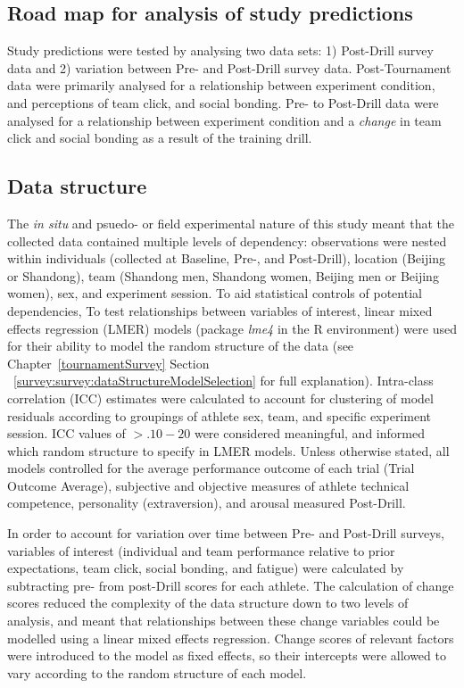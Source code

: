 \subsection{Road map for analysis of study predictions}
Study predictions were tested by analysing two data sets: 1) Post-Drill survey data and 2) variation between Pre- and Post-Drill survey data.  Post-Tournament data were primarily analysed for a relationship between experiment condition, and perceptions of team click, and social bonding.  Pre- to Post-Drill data were analysed for a relationship between experiment condition and a \textit{change} in team click and social bonding as a result of the training drill.


\subsection{Data structure}
The \textit{in situ} and psuedo- or field experimental nature of this study meant that the collected data contained multiple levels of dependency: observations were nested within individuals (collected at Baseline, Pre-, and Post-Drill), location (Beijing or Shandong), team (Shandong men, Shandong women, Beijing men or Beijing women), sex, and experiment session.  To aid statistical controls of potential dependencies, To test relationships between variables of interest, linear mixed effects regression (LMER) models (package \textit{lme4} in the R environment) were used for their ability to model the random structure of the data (see Chapter~\ref{tournamentSurvey} Section ~\ref{survey:survey:dataStructureModelSelection} for full explanation).  Intra-class correlation (ICC) estimates were calculated to account for clustering of model residuals according to groupings of athlete sex, team, and specific experiment session. ICC values of $>.10-20$ were considered meaningful, and informed which random structure to specify in LMER models.   Unless otherwise stated, all models controlled for the average performance outcome of each trial (Trial Outcome Average), subjective and objective measures of athlete technical competence, personality (extraversion), and arousal measured Post-Drill.

In order to account for variation over time between Pre- and Post-Drill surveys, variables of interest (individual and team performance relative to prior expectations, team click, social bonding, and fatigue) were calculated by subtracting pre- from post-Drill scores for each athlete. The calculation of change scores reduced the complexity of the data structure down to two levels of analysis, and meant that relationships between these change variables could be modelled using a linear mixed effects regression. Change scores of relevant factors were introduced to the model as fixed effects, so their intercepts were allowed to vary according to the random structure of each model.

